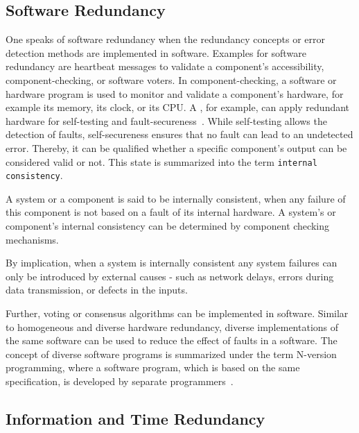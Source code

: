 \subsection{Software Redundancy}
One speaks of software redundancy when the redundancy concepts or error detection methods are implemented in software.
Examples for software redundancy are heartbeat messages to validate a component's accessibility, component-checking, or software voters.
In component-checking, a software or hardware program is used to monitor and validate a component's hardware, for example its memory, its clock, or its \gls*{CPU}.
A , for example, can apply redundant hardware for self-testing and fault-secureness~\cite{SelfCheckingProcessorDesign}.
While self-testing allows the detection of faults, self-secureness ensures that no fault can lead to an undetected error.
Thereby, it can be qualified whether a specific component's output can be considered valid or not.
This state is summarized into the term \texttt{internal consistency}.

\begin{definition}
A system or a component is said to be internally consistent, when any failure of this component is not based on a fault of its internal hardware.
A system's or component's internal consistency can be determined by component checking mechanisms.
\end{definition}

By implication, when a system is internally consistent any system failures can only be introduced by external causes - such as network delays, errors during data transmission, or defects in the inputs.

Further, voting or consensus algorithms can be implemented in software.
Similar to homogeneous and diverse hardware redundancy, diverse implementations of the same software can be used to reduce the effect of faults in a software.
The concept of diverse software programs is summarized under the term N-version programming, where a software program, which is based on the same specification, is developed by separate programmers~\cite{BarryFaultToleranceAnalysis}.

\subsection{Information and Time Redundancy}

